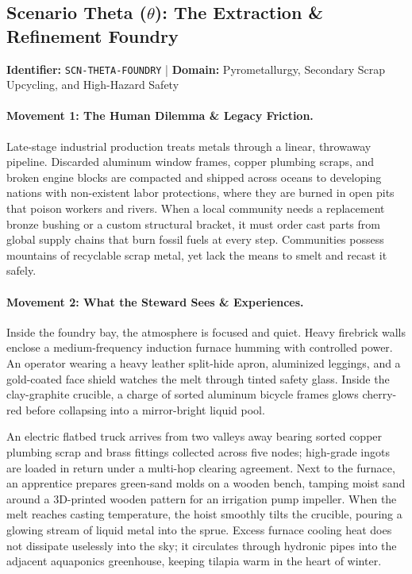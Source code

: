 \subsection{Scenario Theta (\texorpdfstring{$\theta$}{Theta}): The Extraction \& Refinement Foundry}
\label{subsec:scn_theta}
\textbf{Identifier:} \texttt{SCN-THETA-FOUNDRY} \quad | \quad \textbf{Domain:} Pyrometallurgy, Secondary Scrap Upcycling, and High-Hazard Safety

\paragraph{Movement 1: The Human Dilemma \& Legacy Friction.}
Late-stage industrial production treats metals through a linear, throwaway pipeline. Discarded aluminum window frames, copper plumbing scraps, and broken engine blocks are compacted and shipped across oceans to developing nations with non-existent labor protections, where they are burned in open pits that poison workers and rivers. When a local community needs a replacement bronze bushing or a custom structural bracket, it must order cast parts from global supply chains that burn fossil fuels at every step. Communities possess mountains of recyclable scrap metal, yet lack the means to smelt and recast it safely.

\paragraph{Movement 2: What the Steward Sees \& Experiences.}
Inside the foundry bay, the atmosphere is focused and quiet. Heavy firebrick walls enclose a medium-frequency induction furnace humming with controlled power. An operator wearing a heavy leather split-hide apron, aluminized leggings, and a gold-coated face shield watches the melt through tinted safety glass. Inside the clay-graphite crucible, a charge of sorted aluminum bicycle frames glows cherry-red before collapsing into a mirror-bright liquid pool. 

An electric flatbed truck arrives from two valleys away bearing sorted copper plumbing scrap and brass fittings collected across five nodes; high-grade ingots are loaded in return under a multi-hop clearing agreement. Next to the furnace, an apprentice prepares green-sand molds on a wooden bench, tamping moist sand around a 3D-printed wooden pattern for an irrigation pump impeller. When the melt reaches casting temperature, the hoist smoothly tilts the crucible, pouring a glowing stream of liquid metal into the sprue. Excess furnace cooling heat does not dissipate uselessly into the sky; it circulates through hydronic pipes into the adjacent aquaponics greenhouse, keeping tilapia warm in the heart of winter.

